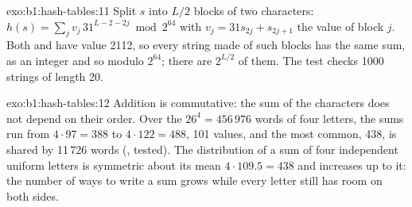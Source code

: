 \begin{solution}{exo:b1:hash-tables:11}
Split $s$ into $L/2$ blocks of two characters: $h(s) = \sum_j v_j\, 31^{L - 2 - 2j} \bmod 2^{64}$ with $v_j = 31 s_{2j} +
s_{2j+1}$ the value of block $j$. Both  and  have value 2112, so every string made of such blocks has
the same sum, as an integer and so modulo $2^{64}$; there are $2^{L/2}$ of them. The test checks 1000 strings of length
20.
\end{solution}

\begin{solution}{exo:b1:hash-tables:12}
Addition is commutative: the sum of the characters does not depend on their order. Over the $26^4 = 456\,976$ words of
four letters, the sums run from $4 \cdot 97 = 388$ to $4 \cdot 122 = 488$, 101 values, and the most common, 438, is
shared by 11\,726 words (, tested). The distribution of a sum of four independent
uniform letters is symmetric about its mean $4 \cdot 109.5 = 438$ and increases up to it: the number of ways to write a
sum grows while every letter still has room on both sides.
\end{solution}

